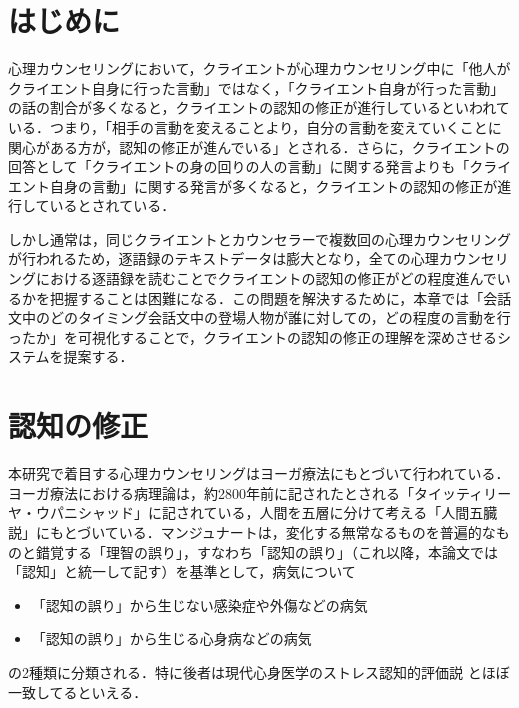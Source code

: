 \documentclass[shuuron]{kuee}
\begin{document}
\section{はじめに}
心理カウンセリングにおいて，クライエントが心理カウンセリング中に「他人がクライエント自身に行った言動」ではなく，「クライエント自身が行った言動」の話の割合が多くなると，クライエントの認知の修正が進行しているといわれている．つまり，「相手の言動を変えることより，自分の言動を変えていくことに関心がある方が，認知の修正が進んでいる」\cite{zokad}とされる．さらに，クライエントの回答として「クライエントの身の回りの人の言動」に関する発言よりも「クライエント自身の言動」に関する発言が多くなると，クライエントの認知の修正が進行しているとされている．

しかし通常は，同じクライエントとカウンセラーで複数回の心理カウンセリングが行われるため，逐語録のテキストデータは膨大となり，全ての心理カウンセリングにおける逐語録を読むことでクライエントの認知の修正がどの程度進んでいるかを把握することは困難になる．この問題を解決するために，本章では「会話文中のどのタイミング会話文中の登場人物が誰に対しての，どの程度の言動を行ったか」を可視化することで，クライエントの認知の修正の理解を深めさせるシステムを提案する．



\section{認知の修正}%

本研究で着目する心理カウンセリングはヨーガ療法にもとづいて行われている．ヨーガ療法における病理論は，約2800年前に記されたとされる「タイッティリーヤ・ウパニシャッド」に記されている，人間を五層に分けて考える「人間五臓説」にもとづいている\cite{kimura}．マンジュナート\cite{manjunath}は，変化する無常なるものを普遍的なものと錯覚する「理智の誤り」，すなわち「認知の誤り」（これ以降，本論文では「認知」と統一して記す）を基準として，病気について
\begin{itemize}
  \item 「認知の誤り」から生じない感染症や外傷などの病気
  \item 「認知の誤り」から生じる心身病などの病気
\end{itemize}
の2種類に分類される．特に後者は現代心身医学のストレス認知的評価説%
\cite{Lazarus}とほぼ一致してるといえる\cite{Darshana}．
\end{document}
